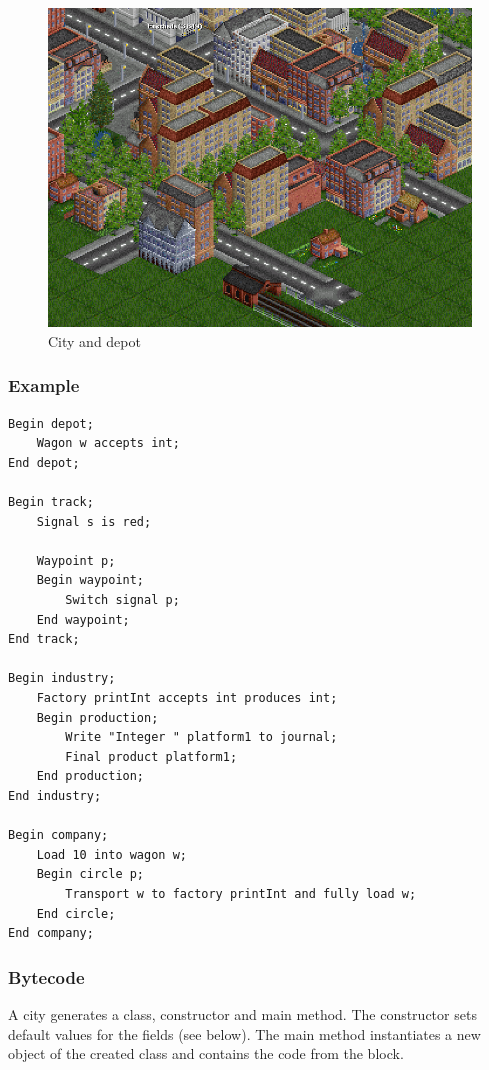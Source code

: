 \begin{figure}[t]
\centering
\includegraphics[scale=0.25]{Images/city_and_depot}
\caption{City and depot}
\label{fig:city_and_depot}
\end{figure}

\subsubsection*{Example}

\begin{lstlisting}
Begin depot;
	Wagon w accepts int;
End depot;

Begin track;
	Signal s is red;
	
	Waypoint p;
	Begin waypoint;
		Switch signal p;
	End waypoint;
End track;

Begin industry;
	Factory printInt accepts int produces int;
	Begin production;
		Write "Integer " platform1 to journal;
		Final product platform1;
	End production;
End industry;

Begin company;
	Load 10 into wagon w;
	Begin circle p;
		Transport w to factory printInt and fully load w;
	End circle;
End company;
\end{lstlisting}

\subsubsection*{Bytecode}

A city generates a class, constructor and main method. The constructor sets default values for the fields (see below). The main method instantiates a new object of the created class and contains the code from the  block.

